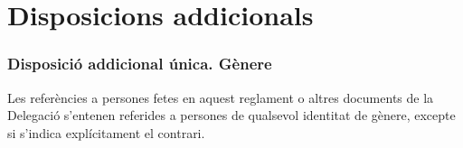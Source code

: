 \documentclass[a4paper,12pt]{article}
\begin{document}
\section*{Disposicions addicionals}

\subsubsection*{Disposició addicional única. Gènere}
Les referències a persones fetes en aquest reglament o altres documents de la Delegació s’entenen referides a persones de qualsevol identitat de gènere, excepte si s’indica explícitament el contrari.
\end{document}
